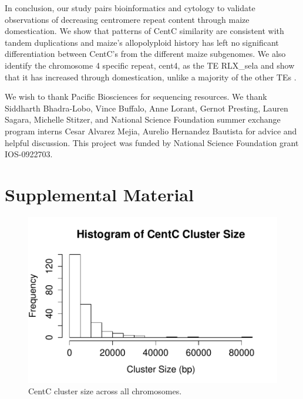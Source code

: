 In conclusion, our study pairs bioinformatics and cytology to validate observations of decreasing centromere repeat content through maize domestication.  We show that patterns of CentC similarity are consistent with tandem duplications and maize’s allopolyploid history has left no significant differentiation between CentC’s from the different maize subgenomes. We also identify the chromosome 4 specific repeat, cent4, as the TE RLX\_sela and show that it has increased through domestication, unlike a majority of the other TEs \citep{Chia2012}.    


\begin{acknowledgements}
We wish to thank Pacific Biosciences for sequencing resources.  We thank Siddharth Bhadra-Lobo, Vince Buffalo, Anne Lorant, Gernot Presting, Lauren Sagara, Michelle Stitzer, and National Science Foundation summer exchange program interns Cesar Alvarez Mejia, Aurelio Hernandez Bautista for advice and helpful discussion. This project was funded by National Science Foundation grant IOS-0922703.
\end{acknowledgements}


\newpage

\beginsupplement
\section*{Supplemental Material}

\begin{figure}[]
\includegraphics[width=1\textwidth]{Supp_clusterhist}
\setcounter{figure}{0}
\caption{CentC cluster size across all chromosomes.}
\label{Supp_clusterhist}    
\end{figure}

